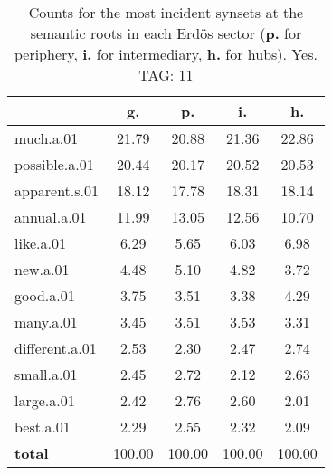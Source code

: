 \begin{table}[h!]
\begin{center}
\begin{tabular}{| l | c | c | c | c |}\hline
 & g. & p. & i. & h. \\\hline
much.a.01 & 21.79  & 20.88  & 21.36  & 22.86 \\\hline
possible.a.01 & 20.44  & 20.17  & 20.52  & 20.53 \\\hline
apparent.s.01 & 18.12  & 17.78  & 18.31  & 18.14 \\\hline
annual.a.01 & 11.99  & 13.05  & 12.56  & 10.70 \\\hline
like.a.01 & 6.29  & 5.65  & 6.03  & 6.98 \\\hline
new.a.01 & 4.48  & 5.10  & 4.82  & 3.72 \\\hline
good.a.01 & 3.75  & 3.51  & 3.38  & 4.29 \\\hline
many.a.01 & 3.45  & 3.51  & 3.53  & 3.31 \\\hline
different.a.01 & 2.53  & 2.30  & 2.47  & 2.74 \\\hline
small.a.01 & 2.45  & 2.72  & 2.12  & 2.63 \\\hline
large.a.01 & 2.42  & 2.76  & 2.60  & 2.01 \\\hline
best.a.01 & 2.29  & 2.55  & 2.32  & 2.09 \\\hline
{{\bf total}} & 100.00  & 100.00  & 100.00  & 100.00 \\\hline
\end{tabular}
\caption{Counts for the most incident synsets at the semantic roots in each Erd\"os sector ({\bf p.} for periphery, {\bf i.} for intermediary, {\bf h.} for hubs). Yes. TAG: 11}
\end{center}
\end{table}